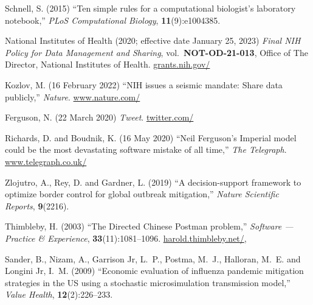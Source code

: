 \documentclass{comjnl}
\begin{document}
{\begin{thebibliography}{100}
{{
Schnell, S. (2015) ``Ten simple rules for a computational biologist's
  laboratory notebook,'' {\em PLoS Computational Biology},
  \textbf{11}(9):e1004385.
\newblock {}

{National Institutes of Health} (2020; effective date January 25, 2023) {\em
  Final {NIH} Policy for Data Management and Sharing},
  vol.~\textbf{NOT-OD-21-013}, Office of The Director, National Institutes of
  Health.
\newblock
  \url{grants.nih.gov/}

Kozlov, M. (16 February 2022) ``{NIH} issues a seismic mandate: {Share} data
  publicly,'' {\em Nature}.
\newblock
  \url{www.nature.com/}

Ferguson, N. (22 March 2020) {\em Tweet}.
\newblock
  \url{twitter.com/}

Richards, D. and Boudnik, K. (16 May 2020) ``{Neil} {Ferguson's} {Imperial}
  model could be the most devastating software mistake of all time,'' {\em The
  Telegraph}.
\newblock
  \url{www.telegraph.co.uk/}

Zlojutro, A., Rey, D. and Gardner, L. (2019) ``A decision-support framework to
  optimize border control for global outbreak mitigation,'' {\em Nature
  Scientific Reports}, \textbf{9}(2216).
\newblock {}

Thimbleby, H. (2003) ``The {Directed Chinese Postman} problem,'' {\em Software
  --- Practice {\&} Experience}, \textbf{33}(11):1081--1096.
\newblock \url{harold.thimbleby.net/},

Sander, B., Nizam, A., {Garrison Jr}, L.~P., Postma, M.~J., Halloran, M.~E. and
  {Longini Jr}, I.~M. (2009) ``Economic evaluation of influenza pandemic
  mitigation strategies in the {US} using a stochastic microsimulation
  transmission model,'' {\em Value Health}, \textbf{12}(2):226--233.
\newblock {}

}}
\end{thebibliography}}
\end{document}
